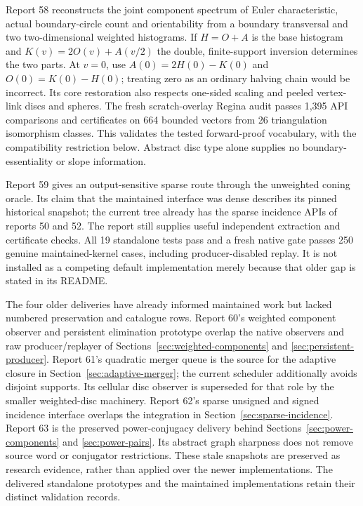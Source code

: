 Report 58 reconstructs the joint component spectrum of Euler characteristic,
actual boundary-circle count and orientability from a boundary transversal
and two two-dimensional weighted histograms. If $H=O+A$ is the base histogram
and $K(v)=2O(v)+A(v/2)$ the double, finite-support inversion determines the
two parts. At $v=0$, use $A(0)=2H(0)-K(0)$ and $O(0)=K(0)-H(0)$; treating
zero as an ordinary halving chain would be incorrect. Its core restoration
also respects one-sided scaling and peeled vertex-link discs and spheres.
The fresh scratch-overlay Regina audit passes 1,395 API comparisons and
certificates on 664 bounded vectors from 26 triangulation isomorphism classes.
This validates the tested forward-proof vocabulary, with the compatibility
restriction below. Abstract disc type alone supplies no boundary-essentiality
or slope information.

Report 59 gives an output-sensitive sparse route through the unweighted
coning oracle. Its claim that the maintained interface was dense describes
its pinned historical snapshot; the current tree already has the sparse
incidence APIs of reports 50 and 52. The report still supplies useful
independent extraction and certificate checks. All 19 standalone tests
pass and a fresh native gate passes 250 genuine maintained-kernel cases,
including producer-disabled replay. It is not installed as a competing
default implementation merely because that older gap is stated in its README.

The four older deliveries have already informed maintained work but lacked
numbered preservation and catalogue rows. Report 60's weighted component
observer and persistent elimination prototype overlap the native observers
and raw producer/replayer of Sections~\ref{sec:weighted-components} and
\ref{sec:persistent-producer}. Report 61's quadratic merger queue is the
source for the adaptive closure in Section~\ref{sec:adaptive-merger}; the
current scheduler additionally avoids disjoint supports. Its cellular disc
observer is superseded for that role by the smaller weighted-disc machinery.
Report 62's sparse unsigned and signed incidence interface overlaps the
integration in Section~\ref{sec:sparse-incidence}. Report 63 is the preserved
power-conjugacy delivery behind Sections~\ref{sec:power-components} and
\ref{sec:power-pairs}. Its abstract graph sharpness does not remove source
word or conjugator restrictions. These stale snapshots are preserved as
research evidence, rather than applied over the newer implementations.
The delivered standalone prototypes and the maintained implementations
retain their distinct validation records.

